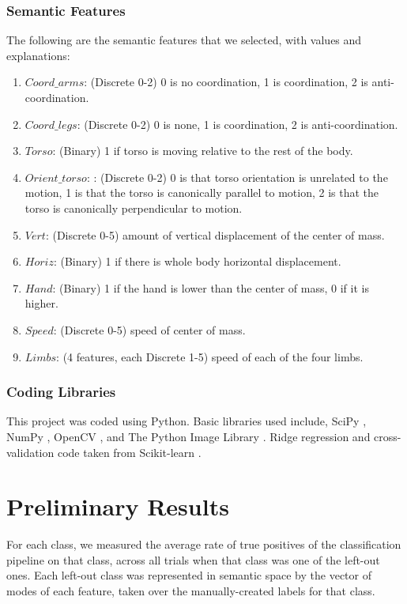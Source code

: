 \documentclass{article}
\begin{document}
\subsubsection{Semantic Features}
\label{sf}
The following are the semantic features that we selected, with values and explanations:
\begin{enumerate}
\item
$Coord\_arms$: (Discrete 0-2) 0 is no coordination, 1 is coordination, 2 is anti-coordination.
\item
$Coord\_legs$: (Discrete 0-2) 0 is none, 1 is coordination, 2 is anti-coordination.
\item
$Torso$: (Binary) 1 if torso is moving relative to the rest of the body.
\item
$Orient\_torso$: : (Discrete 0-2) 0 is that torso orientation is unrelated to the motion, 1 is that the torso is canonically parallel to motion, 2 is that the torso is canonically perpendicular to motion.
\item
$Vert$: (Discrete 0-5) amount of vertical displacement of the center of mass.
\item
$Horiz$: (Binary) 1 if there is whole body horizontal displacement.
\item
$Hand$: (Binary) 1 if the hand is lower than the center of mass, 0 if it is higher.
\item
$Speed$: (Discrete 0-5) speed of center of mass.
\item
$Limbs$: (4 features, each Discrete 1-5) speed of each of the four limbs.
\end{enumerate}
\subsubsection{Coding Libraries}
This project was coded using Python. Basic libraries used include, SciPy \cite{scipy}, NumPy \cite{numpy}, OpenCV \cite{opencv}, and The Python Image Library \cite{pil}. Ridge regression and cross-validation code taken from Scikit-learn \cite{scikit}.

\section{Preliminary Results} %
For each class, we measured the average rate of true positives of the classification pipeline on that class, across all trials when that class was one of the left-out ones. Each left-out class was represented in semantic space by the vector of modes of each feature, taken over the manually-created labels for that class.
\end{document}
